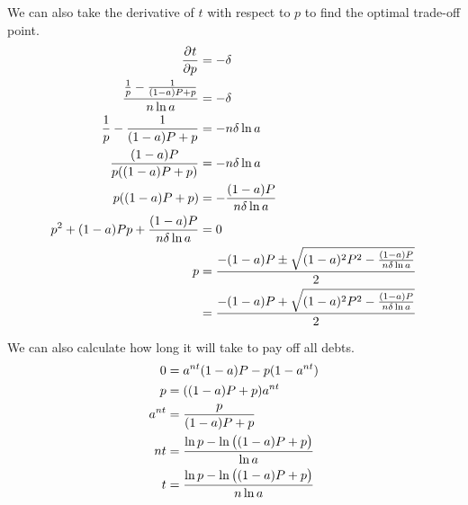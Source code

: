 \documentclass[12pt]{article}
\begin{document}
We can also take the derivative of $t$ with respect to $p$ to find the optimal
trade-off point.
\begin{align*}
    \dpd{t}{p} &= -\delta\\
    \frac{\frac{1}{p} - \frac{1}{(1 - a) P + p}}{n \ln{a}} &= -\delta\\
    \frac{1}{p} - \frac{1}{(1 - a) P + p} &= -n\delta \ln{a}\\
    \frac{(1 - a) P}{p ((1 - a) P + p)} &= -n\delta \ln{a}\\
    p ((1 - a) P + p) &= -\frac{(1 - a) P}{n\delta \ln{a}}\\
    p^2 + (1 - a) Pp + \frac{(1 - a) P}{n\delta \ln{a}} &= 0\\
    p &= \frac{-(1 - a) P \pm \sqrt{(1 - a)^2 P^2 - \frac{(1 - a) P}{n\delta \ln{a}}}}{2}\\
      &= \frac{-(1 - a) P + \sqrt{(1 - a)^2 P^2 - \frac{(1 - a) P}{n\delta \ln{a}}}}{2}\\
\end{align*}

We can also calculate how long it will take to pay off all debts.
\begin{align*}
    0 &= a^{nt} (1 - a) P - p (1 - a^{nt})\\
    p &= ((1 - a) P + p) a^{nt}\\
    a^{nt} &= \frac{p}{(1 - a) P + p}\\
    nt &= \frac{\ln{p} - \ln\del{(1 - a) P + p}}{\ln{a}}\\
    t &= \frac{\ln{p} - \ln\del{(1 - a) P + p}}{n \ln{a}}\\
\end{align*}
\end{document}
